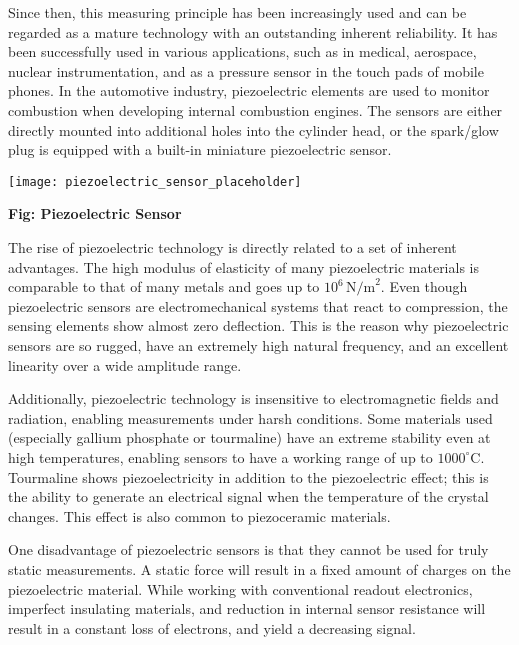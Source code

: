 \documentclass[12pt]{article}
\begin{document}
\newpage



Since then, this measuring principle has been increasingly used and can be regarded as a mature technology with an outstanding inherent reliability. It has been successfully used in various applications, such as in medical, aerospace, nuclear instrumentation, and as a pressure sensor in the touch pads of mobile phones. In the automotive industry, piezoelectric elements are used to monitor combustion when developing internal combustion engines. The sensors are either directly mounted into additional holes into the cylinder head, or the spark/glow plug is equipped with a built-in miniature piezoelectric sensor.

\begin{center}
    \texttt{[image: piezoelectric\_sensor\_placeholder]} %
\end{center}

\begin{center}
    \textbf{Fig: Piezoelectric Sensor}
\end{center}

The rise of piezoelectric technology is directly related to a set of inherent advantages. The high modulus of elasticity of many piezoelectric materials is comparable to that of many metals and goes up to \( 10^6 \, \text{N/m}^2 \). Even though piezoelectric sensors are electromechanical systems that react to compression, the sensing elements show almost zero deflection. This is the reason why piezoelectric sensors are so rugged, have an extremely high natural frequency, and an excellent linearity over a wide amplitude range. 

Additionally, piezoelectric technology is insensitive to electromagnetic fields and radiation, enabling measurements under harsh conditions. Some materials used (especially gallium phosphate or tourmaline) have an extreme stability even at high temperatures, enabling sensors to have a working range of up to \( 1000^\circ \text{C} \). Tourmaline shows piezoelectricity in addition to the piezoelectric effect; this is the ability to generate an electrical signal when the temperature of the crystal changes. This effect is also common to piezoceramic materials.

\newpage

One disadvantage of piezoelectric sensors is that they cannot be used for truly static measurements. A static force will result in a fixed amount of charges on the piezoelectric material. While working with conventional readout electronics, imperfect insulating materials, and reduction in internal sensor resistance will result in a constant loss of electrons, and yield a decreasing signal.
\end{document}

